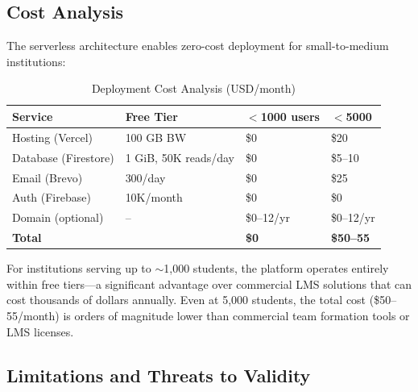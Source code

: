 \documentclass[conference]{IEEEtran}
\begin{document}
\subsection{Cost Analysis}

The serverless architecture enables zero-cost deployment for small-to-medium institutions:

\begin{table}[htbp]
\centering
\caption{Deployment Cost Analysis (USD/month)}
\label{tab:cost}
\footnotesize
\renewcommand{\arraystretch}{1.15}
\begin{tabular}{@{}llll@{}}
\toprule
\textbf{Service} & \textbf{Free Tier} & \textbf{$<$1000 users} & \textbf{$<$5000} \\
\midrule
Hosting (Vercel) & 100 GB BW & \$0 & \$20 \\
Database (Firestore) & 1 GiB, 50K reads/day & \$0 & \$5--10 \\
Email (Brevo) & 300/day & \$0 & \$25 \\
Auth (Firebase) & 10K/month & \$0 & \$0 \\
Domain (optional) & -- & \$0--12/yr & \$0--12/yr \\
\midrule
\textbf{Total} & & \textbf{\$0} & \textbf{\$50--55} \\
\bottomrule
\end{tabular}
\end{table}

For institutions serving up to $\sim$1,000 students, the platform operates entirely within free tiers---a significant advantage over commercial LMS solutions that can cost thousands of dollars annually. Even at 5,000 students, the total cost (\$50--55/month) is orders of magnitude lower than commercial team formation tools or LMS licenses.

\subsection{Limitations and Threats to Validity}
\end{document}
